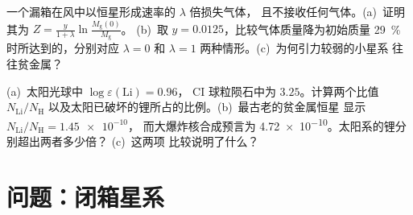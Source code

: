 \begin{exercise}[$\star\star\star$]\label{exo:b3:origin-of-elements:11}
一个漏箱在风中以恒星形成速率的 $\lambda$ 倍损失气体，
且不接收任何气体。(a)~证明其为
$Z = \frac{y}{1 + \lambda}\ln\frac{M_\mathrm{g}(0)}{M_\mathrm{g}}$。
(b)~取 $y = 0.0125$，比较气体质量降为初始质量
\qty{29}{\percent} 时所达到的，分别对应 $\lambda = 0$ 和
$\lambda = 1$ 两种情形。(c)~为何引力较弱的小星系
往往贫金属？
\end{exercise}

\begin{exercise}[$\star\star\star$]\label{exo:b3:origin-of-elements:12}
(a)~太阳光球中 $\log\varepsilon(\mathrm{Li}) = 0.96$，
CI 球粒陨石中为 $3.25$。计算两个比值 $N_\mathrm{Li}/N_\mathrm{H}$
以及太阳已破坏的锂所占的比例。(b)~最古老的贫金属恒星
显示 $N_\mathrm{Li}/N_\mathrm{H} = \num{1.45e-10}$，
而大爆炸核合成预言为 \num{4.72e-10}。太阳系的锂分别超出两者多少倍？
(c)~这两项
比较说明了什么？
\end{exercise}

\section{问题：闭箱星系}

